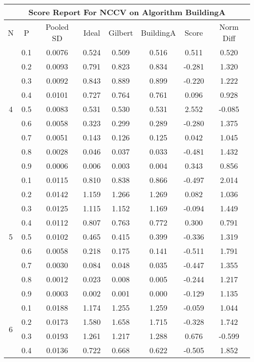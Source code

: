 \documentclass[11pt,a4paper]{report}
\begin{document}
\begin{longtable}{ | c | c || c | c | c | c | c | c | }
\hline
\multicolumn{8}{|c|}{ Score Report For NCCV on Algorithm BuildingA} \\
\hline
N & P & Pooled SD &  Ideal &  Gilbert & BuildingA  & Score & Norm Diff \\
 \hline
 \hline
 \endhead
\multirow{9}{*}{4} & 0.1 & 0.0076 & 0.524 & 0.509 & 0.516 & 0.511 & 0.520 \\
 & 0.2 & 0.0093 & 0.791 & 0.823 & 0.834 & -0.281 & 1.320 \\
 & 0.3 & 0.0092 & 0.843 & 0.889 & 0.899 & -0.220 & 1.222 \\
 & 0.4 & 0.0101 & 0.727 & 0.764 & 0.761 & 0.096 & 0.928 \\
 & 0.5 & 0.0083 & 0.531 & 0.530 & 0.531 & 2.552 & -0.085 \\
 & 0.6 & 0.0058 & 0.323 & 0.299 & 0.289 & -0.280 & 1.375 \\
 & 0.7 & 0.0051 & 0.143 & 0.126 & 0.125 & 0.042 & 1.045 \\
 & 0.8 & 0.0028 & 0.046 & 0.037 & 0.033 & -0.481 & 1.432 \\
 & 0.9 & 0.0006 & 0.006 & 0.003 & 0.004 & 0.343 & 0.856 \\
 \hline
\multirow{9}{*}{5} & 0.1 & 0.0115 & 0.810 & 0.838 & 0.866 & -0.497 & 2.014 \\
 & 0.2 & 0.0142 & 1.159 & 1.266 & 1.269 & 0.082 & 1.036 \\
 & 0.3 & 0.0125 & 1.115 & 1.152 & 1.169 & -0.094 & 1.449 \\
 & 0.4 & 0.0112 & 0.807 & 0.763 & 0.772 & 0.300 & 0.791 \\
 & 0.5 & 0.0102 & 0.465 & 0.415 & 0.399 & -0.336 & 1.319 \\
 & 0.6 & 0.0058 & 0.218 & 0.175 & 0.141 & -0.511 & 1.791 \\
 & 0.7 & 0.0030 & 0.084 & 0.048 & 0.035 & -0.447 & 1.355 \\
 & 0.8 & 0.0012 & 0.023 & 0.008 & 0.005 & -0.244 & 1.217 \\
 & 0.9 & 0.0003 & 0.002 & 0.001 & 0.000 & -0.129 & 1.135 \\
 \hline
\multirow{9}{*}{6} & 0.1 & 0.0188 & 1.174 & 1.255 & 1.259 & -0.059 & 1.044 \\
 & 0.2 & 0.0173 & 1.580 & 1.658 & 1.715 & -0.328 & 1.742 \\
 & 0.3 & 0.0193 & 1.261 & 1.217 & 1.288 & 0.676 & -0.599 \\
 & 0.4 & 0.0136 & 0.722 & 0.668 & 0.622 & -0.505 & 1.852 \\

\end{longtable}
\end{document}
